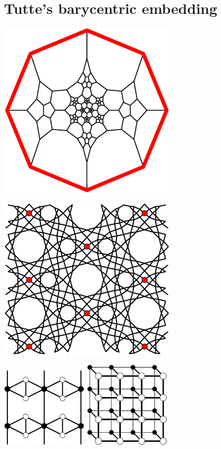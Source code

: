 \documentclass{beamer}
\begin{document}
\section{Tutte's barycentric embedding}

\begin{frame}
  \begin{center}
    \includegraphics[width=3.5in]{schlegel2}
  \end{center}
\end{frame}

\begin{frame}
  \begin{center}
    \includegraphics[width=3.5in]{al-equilibrium}
  \end{center}
\end{frame}

\begin{frame}
  \begin{center}
    \includegraphics[width=1.7in]{unstable}
    \qquad
    \includegraphics[width=1.7in]{ladder}
  \end{center}
\end{frame}
\end{document}
